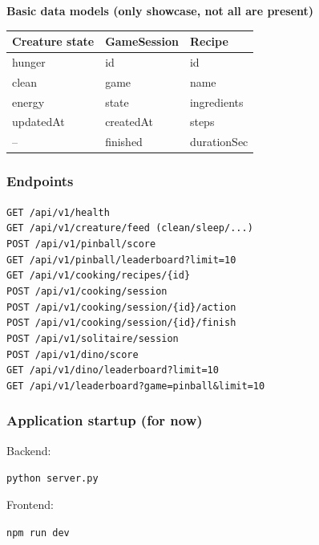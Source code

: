 \documentclass[11pt]{article}
\begin{document}
\noindent\textbf{Basic data models (only showcase, not all are present)}
\begin{table}[H]
\centering
\begin{tabular}{|l|l|l|}
\hline
\textbf{Creature state} & \textbf{GameSession} & \textbf{Recipe} \\ \hline
hunger       & id          & id          \\ \hline
clean        & game        & name        \\ \hline
energy       & state       & ingredients \\ \hline
updatedAt    & createdAt   & steps       \\ \hline
--           & finished    & durationSec \\ \hline
\end{tabular}
\end{table}

\subsubsection*{Endpoints}
\verb|GET /api/v1/health| \\
\verb|GET /api/v1/creature/feed (clean/sleep/...)| \\
\verb|POST /api/v1/pinball/score| \\
\verb|GET /api/v1/pinball/leaderboard?limit=10| \\
\verb|GET /api/v1/cooking/recipes/{id}| \\
\verb|POST /api/v1/cooking/session| \\
\verb|POST /api/v1/cooking/session/{id}/action| \\
\verb|POST /api/v1/cooking/session/{id}/finish| \\
\verb|POST /api/v1/solitaire/session| \\
\verb|POST /api/v1/dino/score| \\
\verb|GET /api/v1/dino/leaderboard?limit=10| \\
\verb|GET /api/v1/leaderboard?game=pinball&limit=10| \\

\subsubsection*{Application startup (for now)}

Backend:

\verb|python server.py|

\noindent Frontend:

\verb|npm run dev|
\end{document}
